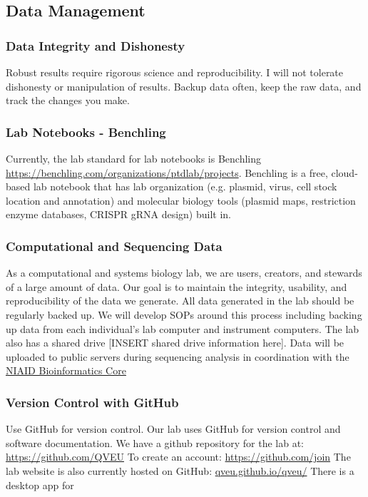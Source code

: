 \documentclass[10pt, a4paper, twocolumn]{article} %
\begin{document}
\subsection{Data Management}
\subsubsection{Data Integrity and Dishonesty}
Robust results require rigorous science and reproducibility. I will not tolerate dishonesty or manipulation of results. Backup data often, keep the raw data, and track the changes you make.

\subsubsection{Lab Notebooks - Benchling}
Currently, the lab standard for lab notebooks is Benchling \href{https://benchling.com/organizations/ptdlab/projects}{https://benchling.com/organizations/ptdlab/projects}. Benchling is a free, cloud-based lab notebook that has lab organization (e.g. plasmid, virus, cell stock location and annotation) and molecular biology tools (plasmid maps, restriction enzyme databases, CRISPR gRNA design) built in.

\subsubsection{Computational and Sequencing Data}
As a computational and systems biology lab, we are users, creators, and stewards of a large amount of data. Our goal is to maintain the integrity, usability, and reproducibility of the data we generate. All data generated in the lab should be regularly backed up. We will develop SOPs around this process including backing up data from each individual's lab computer and instrument computers. The lab also has a shared drive [INSERT shared drive information here]. Data will be uploaded to public servers during sequencing analysis in coordination with the \href{https://bioinformatics.niaid.nih.gov/}{NIAID Bioinformatics Core}

\subsubsection{Version Control with GitHub}
Use GitHub for version control. Our lab uses GitHub for version control and software documentation. We have a github repository for the lab at: \href{https://github.com/QVEU}{https://github.com/QVEU}
To create an account: \href{https://github.com/join}{https://github.com/join}
The lab website is also currently hosted on GitHub: \href{https://qveu.github.io/QVEU/}{qveu.github.io/qveu/}
\newline
There is a desktop app for
\end{document}
